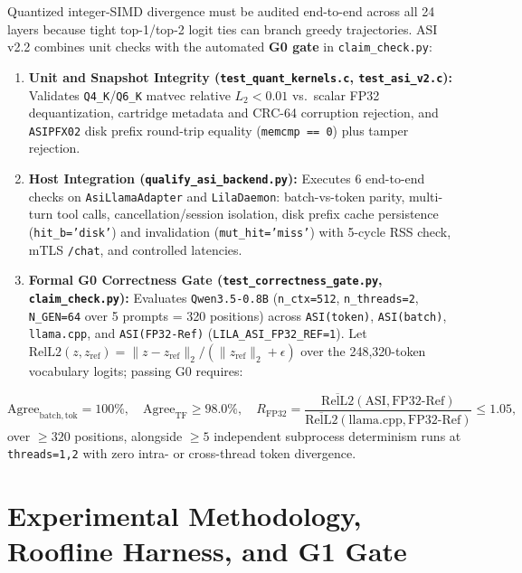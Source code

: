 \documentclass[11pt,a4paper]{article}
\begin{document}
Quantized integer-SIMD divergence must be audited end-to-end across all 24 layers because tight top-1/top-2 logit ties can branch greedy trajectories. ASI v2.2 combines unit checks with the automated \textbf{G0 gate} in \texttt{claim\_check.py}:

\begin{enumerate}
    \item \textbf{Unit and Snapshot Integrity (\texttt{test\_quant\_kernels.c}, \texttt{test\_asi\_v2.c}):} Validates \texttt{Q4\_K}/\texttt{Q6\_K} matvec relative $L_2 < 0.01$ vs.\ scalar FP32 dequantization, cartridge metadata and CRC-64 corruption rejection, and \texttt{ASIPFX02} disk prefix round-trip equality (\texttt{memcmp == 0}) plus tamper rejection.
    \item \textbf{Host Integration (\texttt{qualify\_asi\_backend.py}):} Executes 6 end-to-end checks on \texttt{AsiLlamaAdapter} and \texttt{LilaDaemon}: batch-vs-token parity, multi-turn tool calls, cancellation/session isolation, disk prefix cache persistence (\texttt{hit\_b='disk'}) and invalidation (\texttt{mut\_hit='miss'}) with 5-cycle RSS check, mTLS \texttt{/chat}, and controlled latencies.
    \item \textbf{Formal G0 Correctness Gate (\texttt{test\_correctness\_gate.py}, \texttt{claim\_check.py}):} Evaluates \texttt{Qwen3.5-0.8B} (\texttt{n\_ctx=512}, \texttt{n\_threads=2}, \texttt{N\_GEN=64} over 5 prompts = 320 positions) across \texttt{ASI(token)}, \texttt{ASI(batch)}, \texttt{llama.cpp}, and \texttt{ASI(FP32-Ref)} (\texttt{LILA\_ASI\_FP32\_REF=1}). Let $\mathrm{RelL2}(z, z_{\mathrm{ref}}) = \|z - z_{\mathrm{ref}}\|_2 / (\|z_{\mathrm{ref}}\|_2 + \epsilon)$ over the 248,320-token vocabulary logits; passing G0 requires:
\end{enumerate}

\begin{equation}
\label{eq:g0_gate}
\mathrm{Agree}_{\mathrm{batch,tok}} = 100\%,\quad
\mathrm{Agree}_{\mathrm{TF}} \ge 98.0\%,\quad
R_{\mathrm{FP32}} = \frac{\overline{\mathrm{RelL2}}(\mathrm{ASI}, \mathrm{FP32\text{-}Ref})}{\overline{\mathrm{RelL2}}(\mathrm{llama.cpp}, \mathrm{FP32\text{-}Ref})} \le 1.05,
\end{equation}
over $\ge 320$ positions, alongside $\ge 5$ independent subprocess determinism runs at \texttt{threads=1,2} with zero intra- or cross-thread token divergence.

\section{Experimental Methodology, Roofline Harness, and G1 Gate}
\end{document}
